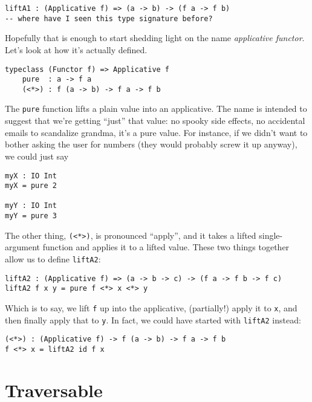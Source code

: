 \documentclass{book}
\newcommand{\mlil}[1]{\lstinline[language=pseudoml,columns=fixed]|#1|}\usepackage{caption}
\begin{document}
\begin{lstlisting}[language=pseudoml]
liftA1 : (Applicative f) => (a -> b) -> (f a -> f b)
-- where have I seen this type signature before?
\end{lstlisting}

Hopefully that is enough to start shedding light on the name \emph{applicative functor}. Let's look at how it's actually defined.

\begin{lstlisting}[language=pseudoml]
typeclass (Functor f) => Applicative f
    pure  : a -> f a
    (<*>) : f (a -> b) -> f a -> f b
\end{lstlisting}

The \mlil{pure} function lifts a plain value into an applicative. The name is intended to suggest that we're getting ``just'' that value: no spooky side effects, no accidental emails to scandalize grandma, it's a pure value. For instance, if we didn't want to bother asking the user for numbers (they would probably screw it up anyway), we could just say

\begin{lstlisting}[language=pseudoml]
myX : IO Int
myX = pure 2

myY : IO Int
myY = pure 3
\end{lstlisting}

The other thing, \mlil{(<*>)}, is pronounced ``apply'', and it takes a lifted single-argument function and applies it to a lifted value. These two things together allow us to define \mlil{liftA2}:

\begin{lstlisting}[language=pseudoml]
liftA2 : (Applicative f) => (a -> b -> c) -> (f a -> f b -> f c)
liftA2 f x y = pure f <*> x <*> y
\end{lstlisting}

Which is to say, we lift \mlil{f} up into the applicative, (partially!) apply it to \mlil{x}, and then finally apply that to \mlil{y}. In fact, we could have started with \mlil{liftA2} instead:

\begin{lstlisting}[language=pseudoml]
(<*>) : (Applicative f) -> f (a -> b) -> f a -> f b
f <*> x = liftA2 id f x
\end{lstlisting}

\section{Traversable}
\end{document}
